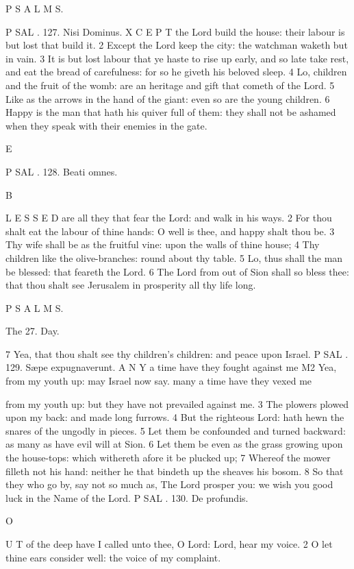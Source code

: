 P S A L M S.

P SAL . 127. Nisi Dominus. X C E P T the Lord build the house: their labour is but lost that build it. 2 Except the Lord keep the city: the watchman waketh but in vain. 3 It is but lost labour that ye haste to rise up early, and so late take rest, and eat the bread of carefulness: for so he giveth his beloved sleep. 4 Lo, children and the fruit of the womb: are an heritage and gift that cometh of the Lord. 5 Like as the arrows in the hand of the giant: even so are the young children. 6 Happy is the man that hath his quiver full of them: they shall not be ashamed when they speak with their enemies in the gate.

E

P SAL . 128. Beati omnes.

B

L E S S E D are all they that fear the Lord: and walk in his ways. 2 For thou shalt eat the labour of thine hands: O well is thee, and happy shalt thou be. 3 Thy wife shall be as the fruitful vine: upon the walls of thine house; 4 Thy children like the olive-branches: round about thy table. 5 Lo, thus shall the man be blessed: that feareth the Lord. 6 The Lord from out of Sion shall so bless thee: that thou shalt see Jerusalem in prosperity all thy life long.

P S A L M S.

The 27. Day.

7 Yea, that thou shalt see thy children’s children: and peace upon Israel. P SAL . 129. Sæpe expugnaverunt. A N Y a time have they fought against me M2 Yea, from my youth up: may Israel now say. many a time have they vexed me

from my youth up: but they have not prevailed against me. 3 The plowers plowed upon my back: and made long furrows. 4 But the righteous Lord: hath hewn the snares of the ungodly in pieces. 5 Let them be confounded and turned backward: as many as have evil will at Sion. 6 Let them be even as the grass growing upon the house-tops: which withereth afore it be plucked up; 7 Whereof the mower filleth not his hand: neither he that bindeth up the sheaves his bosom. 8 So that they who go by, say not so much as, The Lord prosper you: we wish you good luck in the Name of the Lord. P SAL . 130. De profundis.

O

U T of the deep have I called unto thee, O Lord: Lord, hear my voice. 2 O let thine ears consider well: the voice of my complaint.

